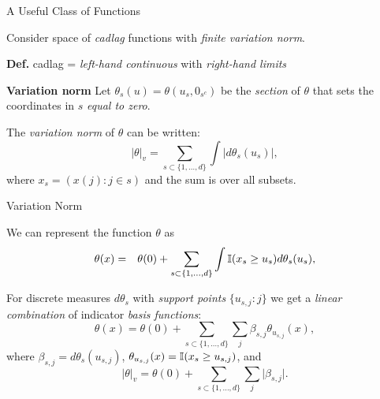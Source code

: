 \documentclass{beamer}
\begin{document}
\begin{frame}{A Useful Class of Functions}
\vspace{0.75cm}

Consider space of \textit{cadlag} functions with \textit{finite variation
norm}.

\textbf{Def.} cadlag = \textit{left-hand continuous} with
\textit{right-hand limits}
\vspace{0.25cm}

\textbf{Variation norm}
Let $\theta_s(u)=\theta(u_s,0_{s^c})$ be the \textit{section} of $\theta$ that
sets the coordinates in $s$ \textit{equal to zero}.
\vspace{0.15cm}

The \textit{variation norm} of $\theta$ can be written:
\[
  \lvert \theta \rvert_v=\sum_{s\subset\{1,\dots,d\}}\int \mid
  d\theta_s(u_s)\mid ,
\]
where $x_s=(x(j):j\in s)$ and the sum is over all subsets.

\note{
}

\end{frame}


\begin{frame}{Variation Norm}

We can represent the function $\theta$ as
\begin{eqnarray*}
\theta(x)&=&\theta(0) + \sum_{s\subset\{1,\ldots,d\}}
  \int \mathbb{I}(x_s\geq u_s)d\theta_s(u_s),
\end{eqnarray*}

For discrete measures $d\theta_s$ with \textit{support points} $\{u_{s,j}:j\}$
we get a \textit{linear combination} of indicator \textit{basis functions}:
\[
  \theta(x) = \theta(0) + \sum_{s\subset\{1,\ldots,d\}}\sum_{j} \beta_{s,j}
    \theta_{u_{s,j}}(x),
\]
where $\beta_{s,j}=d\theta_s(u_{s,j})$,
$\theta_{u_{s,j}}(x) = \mathbb{I}(x_s \ge u_{s,j})$,
and
\begin{equation*}
\lvert \theta \rvert_v = \theta(0) + \sum_{s\subset\{1,\ldots,d\}}
  \sum_j \lvert \beta_{s,j} \rvert.
\end{equation*}

\note{
}

\end{frame}

\end{document}
